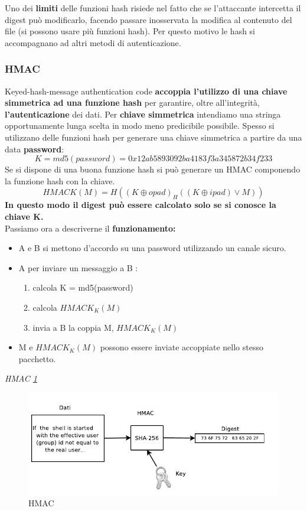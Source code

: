 \documentclass[12pt]{article}
\begin{document}
			Uno dei \textbf{limiti} delle funzioni hash risiede nel fatto che se l'attaccante intercetta il digest può modificarlo, facendo passare inosservata la modifica al contenuto del file (si possono usare più funzioni hash). Per questo motivo le hash si accompagnano ad altri metodi di autenticazione.
			\subsubsection{HMAC}
				Keyed-hash-message authentication code \textbf{accoppia l'utilizzo di una chiave simmetrica ad una funzione hash} per garantire, oltre all'integrità, \textbf{l'autenticazione} dei dati. Per \textbf{chiave simmetrica} intendiamo una stringa opportunamente lunga scelta in modo meno predicibile possibile. Spesso si utilizzano delle funzioni hash per generare una chiave simmetrica a partire da una data \textbf{password}:
				$$ K = md5(password) = 0x12ab5893092ba4183f3a345872b34f233$$
				Se si dispone di una buona funzione hash si può generare un HMAC componendo la funzione hash con la chiave.
				$$HMACK (M) = H((K \oplus opad) _ H((K \oplus ipad) \vee M)) $$
				\textbf{In questo modo il digest può essere calcolato solo se si conosce la chiave K.}\\
				Passiamo ora a descriverne il \textbf{funzionamento:}
				\begin{itemize}
					\item A e B si mettono d'accordo su una password utilizzando un canale sicuro.
					\item A per inviare un messaggio a B :
					\begin{enumerate}
						\item calcola K = md5(password)
						\item calcola $HMACK_{K}(M)$
						\item invia a B la coppia M, $HMACK_{K}(M)$
					\end{enumerate}
					\item M e $HMACK_{K}(M)$ possono essere inviate accoppiate nello stesso pacchetto.
				\end{itemize} 
			
				\textit{HMAC \ref{fig:13}}\\
				\begin{figure}[h!]
					\centering
					\includegraphics[scale=0.60]{img/hamac.PNG}
					\caption{HMAC \label{fig:13}}
				\end{figure}\\
				
\end{document}
